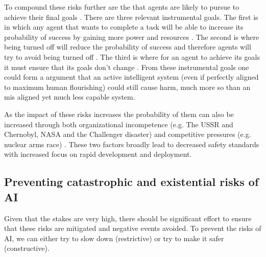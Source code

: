 To compound these risks further are the  that agents are likely to pursue to achieve their final goals \cite{bengioSuperintelligentAgentsPose2025a,omohundroBasicAIDrives2018}. There are three relevant instrumental goals. The first is  in which any agent that wants to complete a task will be able to increase its probability of success by gaining more power and resources \cite{omohundroBasicAIDrives2018}. The second is  where being turned off will reduce the probability of success and therefore agents will try to avoid being turned off \cite{hadfield-menellOffSwitchGame2017}. The third is  where for an agent to achieve its goals it must ensure that its goals don't change \cite{soaresCorrigibility2015}. From these instrumental goals one could form a argument that an active intelligent system (even if perfectly aligned to maximum human flourishing) could still cause harm, much more so than an mis aligned yet much less capable system.

As the impact of these risks increases the probability of them can also be increased through both organizational incompetence (e.g. The USSR and Chernobyl, NASA and the Challenger disaster) and competitive pressures (e.g. nuclear arms race) \cite{hendrycksOverviewCatastrophicAI2023}. These two factors broadly lead to decreased safety standards with increased focus on rapid development and deployment.

\subsection{Preventing catastrophic and existential risks of AI}

Given that the stakes are very high, there should be significant effort to ensure that these risks are mitigated and negative events avoided. To prevent the risks of AI, we can either try to slow down (restrictive) or try to make it safer (constructive).

